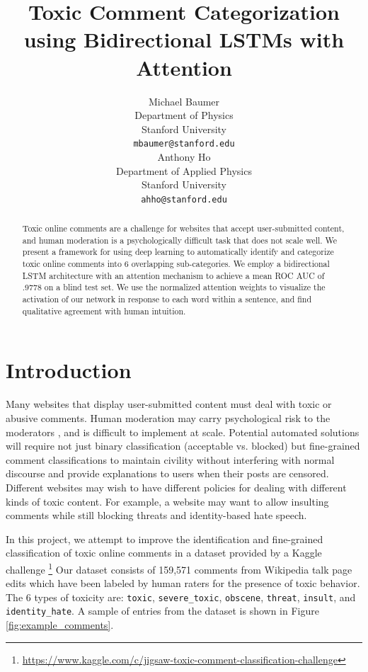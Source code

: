 \documentclass{article} %
\title{Toxic Comment Categorization using Bidirectional LSTMs with Attention}
\author{
Michael Baumer \\
Department of Physics\\
Stanford University\\
\texttt{mbaumer@stanford.edu} \\
\And
Anthony Ho \\
Department of Applied Physics \\
Stanford University \\
\texttt{ahho@stanford.edu} \\
}
\begin{document}
\maketitle

\begin{abstract}
Toxic online comments are a challenge for websites that accept user-submitted content, and human moderation is a psychologically difficult task that does not scale well. We present a framework for using deep learning to automatically identify and categorize toxic online comments into 6 overlapping sub-categories. We employ a bidirectional LSTM architecture with an attention mechanism to achieve a mean ROC AUC of .9778 on a blind test set. We use the normalized attention weights to visualize the activation of our network in response to each word within a sentence, and find qualitative agreement with human intuition. 
\end{abstract}

\section{Introduction}

Many websites that display user-submitted content must deal with toxic or abusive comments. Human moderation may carry psychological risk to the moderators \cite{atlantic}, and is difficult to implement at scale. Potential automated solutions will require not just binary classification (acceptable vs. blocked) but fine-grained comment classifications to maintain civility without interfering with normal discourse and provide explanations to users when their posts are censored. Different websites may wish to have different policies for dealing with different kinds of toxic content. For example, a website may want to allow insulting comments while still blocking threats and identity-based hate speech. 

In this project, we attempt to improve the identification and fine-grained classification of toxic online comments in a dataset provided by a Kaggle challenge \footnote{\url{https://www.kaggle.com/c/jigsaw-toxic-comment-classification-challenge}} Our dataset consists of 159,571 comments from Wikipedia talk page edits which have been labeled by human raters for the presence of toxic behavior. The 6 types of toxicity are: \texttt{toxic}, \texttt{severe\_toxic}, \texttt{obscene}, \texttt{threat}, \texttt{insult}, and \texttt{identity\_hate}. A sample of entries from the dataset is shown in Figure \ref{fig:example_comments}.
\end{document}
